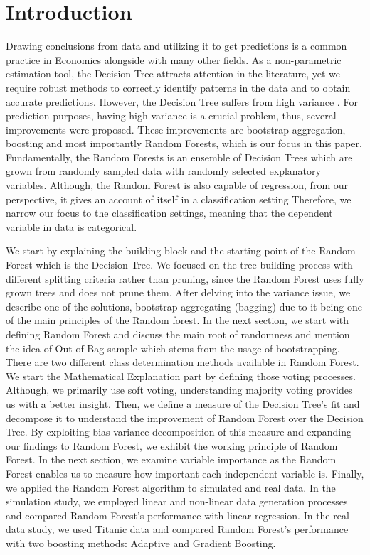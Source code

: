 \section{Introduction}
\label{ch:intro}

Drawing conclusions from data and utilizing it to get predictions is a common 
practice in Economics alongside with many other fields. 
As a non-parametric estimation tool, the Decision Tree attracts attention in the literature,
yet we require robust methods to correctly identify patterns in the data and to obtain accurate predictions.
However, the Decision Tree suffers from high variance \cite{friedman2001elements}. 
For prediction purposes, having high variance is a crucial problem, thus, several improvements were proposed.
These improvements are bootstrap aggregation, boosting and most importantly Random Forests, which is our focus in this paper. 
Fundamentally, the Random Forests is an ensemble of Decision Trees which are grown from randomly sampled data with 
randomly selected explanatory variables. 
Although, the Random Forest is also capable of regression, 
from our perspective, it gives an account of itself in a classification setting 
Therefore, we narrow our focus to the classification settings, 
meaning that the dependent variable in data is categorical.


We start by explaining the building block and the starting point of the Random Forest which is the Decision Tree.
We focused on the tree-building process with different splitting criteria rather than pruning, since
the Random Forest uses fully grown trees and does not prune them.
After delving into the variance issue, we describe one of the solutions, bootstrap aggregating (bagging) 
due to it being one of the main principles of the Random forest.
In the next section, we start with defining Random Forest 
and discuss the main root of randomness and mention the idea of 
Out of Bag sample which stems from the usage of bootstrapping.
There are two different class determination methods available in Random Forest. 
We start the Mathematical Explanation part by defining those voting processes. 
Although, we primarily use soft voting, understanding majority voting provides us with a better insight.
Then, we define a measure of the Decision Tree's fit and decompose it to 
understand the improvement of Random Forest over the Decision Tree.
By exploiting bias-variance decomposition of this measure and expanding our findings to Random Forest, 
we exhibit the working principle of Random Forest.
In the next section, we examine variable importance as the Random Forest enables us to measure 
how important each independent variable is.
Finally, we applied the Random Forest algorithm to simulated and real data.
In the simulation study, we employed linear and non-linear data generation processes 
and compared Random Forest's performance with linear regression.
In the real data study, we used Titanic data \cite{titanicData} 
and compared Random Forest's performance with two boosting methods: Adaptive and Gradient Boosting.

